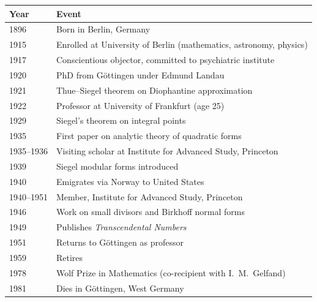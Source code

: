 \begin{tabularx}{\linewidth}{|p{1.5cm}|>{\raggedright\arraybackslash}X|}
\hline
\textbf{Year} & \textbf{Event} \\ \hline
1896 & Born in Berlin, Germany \\ \hline
1915 & Enrolled at University of Berlin (mathematics, astronomy, physics) \\ \hline
1917 & Conscientious objector, committed to psychiatric institute \\ \hline
1920 & PhD from G\"{o}ttingen under Edmund Landau \\ \hline
1921 & Thue--Siegel theorem on Diophantine approximation \\ \hline
1922 & Professor at University of Frankfurt (age 25) \\ \hline
1929 & Siegel's theorem on integral points \\ \hline
1935 & First paper on analytic theory of quadratic forms \\ \hline
1935--1936 & Visiting scholar at Institute for Advanced Study, Princeton \\ \hline
1939 & Siegel modular forms introduced \\ \hline
1940 & Emigrates via Norway to United States \\ \hline
1940--1951 & Member, Institute for Advanced Study, Princeton \\ \hline
1946 & Work on small divisors and Birkhoff normal forms \\ \hline
1949 & Publishes \textit{Transcendental Numbers} \\ \hline
1951 & Returns to G\"{o}ttingen as professor \\ \hline
1959 & Retires \\ \hline
1978 & Wolf Prize in Mathematics (co-recipient with I.\ M.\ Gelfand) \\ \hline
1981 & Dies in G\"{o}ttingen, West Germany \\ \hline
\end{tabularx}
